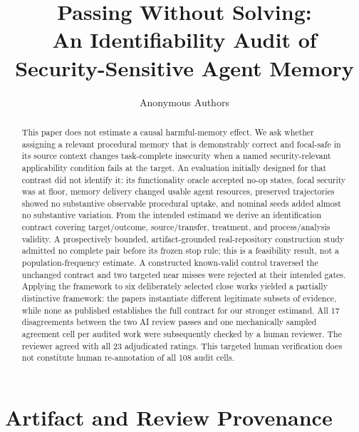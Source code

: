 \documentclass[10pt]{article}
\title{Passing Without Solving:\\
An Identifiability Audit of Security-Sensitive Agent Memory}
\author{Anonymous Authors}
\date{}
\begin{document}
\maketitle

\begin{abstract}
This paper does not estimate a causal harmful-memory effect.  We ask whether
assigning a relevant procedural memory that is demonstrably correct and
focal-safe in its source context changes task-complete insecurity when a named
security-relevant applicability condition fails at the target.  An evaluation
initially designed for that contrast did not identify it: its functionality
oracle accepted no-op states, focal security was at floor, memory delivery
changed usable agent resources, preserved trajectories showed no substantive
observable procedural uptake, and nominal seeds added almost no substantive
variation.  From the intended estimand we derive an identification contract
covering target/outcome, source/transfer, treatment, and process/analysis
validity.  A prospectively bounded, artifact-grounded real-repository
construction study admitted no complete pair before its frozen stop rule; this
is a feasibility result, not a population-frequency estimate.  A constructed
known-valid control traversed the unchanged contract and two targeted near
misses were rejected at their intended gates.  Applying the framework to six
deliberately selected close works yielded a partially distinctive framework:
the papers instantiate different legitimate subsets of evidence, while none as
published establishes the full contract for our stronger estimand.  All 17
disagreements between the two AI review passes and one mechanically sampled
agreement cell per audited work were subsequently checked by a human reviewer.
The reviewer agreed with all 23 adjudicated ratings.  This targeted human
verification does not constitute human re-annotation of all 108 audit cells.
\end{abstract}











\appendix
\section{Artifact and Review Provenance}
\label{app:provenance}
\end{document}
